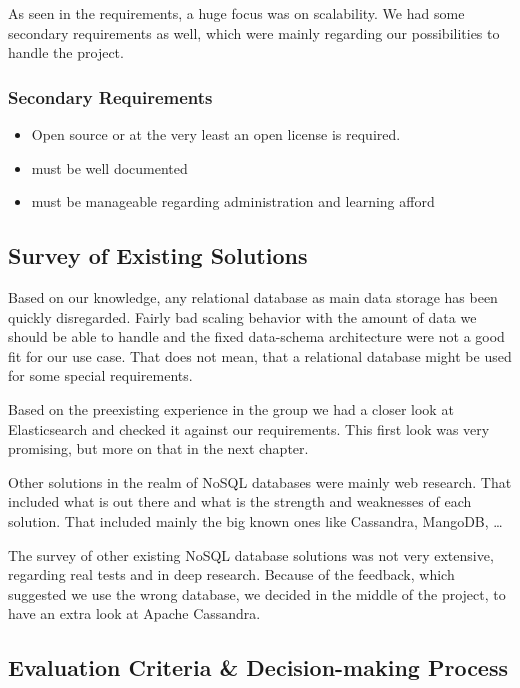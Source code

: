 As seen in the requirements, a huge focus was on scalability. We had
some secondary requirements as well, which were mainly regarding our
possibilities to handle the project.

\subsubsection{Secondary Requirements}\label{secondary-requirements}

\begin{itemize}
\tightlist
\item
  Open source or at the very least an open license is required.
\item
  must be well documented
\item
  must be manageable regarding administration and learning afford
\end{itemize}

\subsection{Survey of Existing
Solutions}\label{survey-of-existing-solutions}

Based on our knowledge, any relational database as main data storage has
been quickly disregarded. Fairly bad scaling behavior with the amount of
data we should be able to handle and the fixed data-schema architecture
were not a good fit for our use case. That does not mean, that a
relational database might be used for some special requirements.

Based on the preexisting experience in the group we had a closer look at
Elasticsearch and checked it against our requirements. This first look
was very promising, but more on that in the next chapter.

Other solutions in the realm of NoSQL databases were mainly web
research. That included what is out there and what is the strength and
weaknesses of each solution. That included mainly the big known ones
like Cassandra, MangoDB, \ldots{}

The survey of other existing NoSQL database solutions was not very
extensive, regarding real tests and in deep research. Because of the
feedback, which suggested we use the wrong database, we decided in the
middle of the project, to have an extra look at Apache Cassandra.

\subsection{Evaluation Criteria \& Decision-making
Process}\label{evaluation-criteria-decision-making-process}


